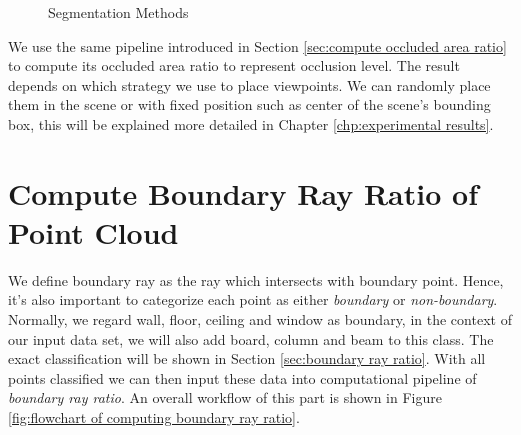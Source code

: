 \documentclass[11pt, a4paper,oneside,chapterprefix=false]{scrbook}
\begin{document}
\begin{figure}[H]
    \centering
      \label{fig:region growing} 
     \label{fig:gocopp}
    \caption{Segmentation Methods}
    \label{segmentation results}
\end{figure}

We use the same pipeline introduced in Section \ref{sec:compute occluded area ratio} to compute its occluded area ratio to represent occlusion level. The result depends on which strategy we use to place viewpoints. We can randomly place them in the scene or with fixed position such as center of the scene's bounding box, this will be explained more detailed in Chapter \ref{chp:experimental results}.

\section{Compute Boundary Ray Ratio of Point Cloud} \label{compute boundary ray ratio of point cloud} 

We define boundary ray as the ray which intersects with boundary point. Hence, it's also important to categorize each point as either \emph{boundary} or \emph{non-boundary}. Normally, we regard wall, floor, ceiling and window as boundary, in the context of our input data set, we will also add board, column and beam to this class. The exact classification will be shown in Section \ref{sec:boundary ray ratio}. With all points classified we can then input these data into computational pipeline of \emph{boundary ray ratio}. An overall workflow of this part is shown in Figure \ref{fig:flowchart of computing boundary ray ratio}.
\end{document}
